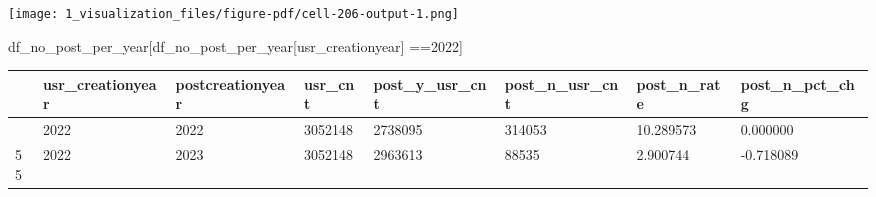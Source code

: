 \documentclass[
  letterpaper,
  DIV=11,
  numbers=noendperiod]{scrartcl}
\newenvironment{Shaded}{\begin{snugshade}}{\end{snugshade}}
\newcommand{\NormalTok}[1]{\textcolor[rgb]{0.00,0.23,0.31}{#1}}
\newcommand{\OperatorTok}[1]{\textcolor[rgb]{0.37,0.37,0.37}{#1}}
\newcommand{\StringTok}[1]{\textcolor[rgb]{0.13,0.47,0.30}{#1}}
\begin{document}
\texttt{[image: 1\_visualization\_files/figure-pdf/cell-206-output-1.png]}

\begin{Shaded}
\begin{Highlighting}[]
\NormalTok{df\_no\_post\_per\_year[df\_no\_post\_per\_year[}\StringTok{\textquotesingle{}usr\_creationyear\textquotesingle{}}\NormalTok{] }\OperatorTok{==}\StringTok{\textquotesingle{}2022\textquotesingle{}}\NormalTok{]}
\end{Highlighting}
\end{Shaded}

\begin{longtable}[]{@{}llllllll@{}}
\toprule\noalign{}
& usr\_creationyear & postcreationyear & usr\_cnt & post\_y\_usr\_cnt &
post\_n\_usr\_cnt & post\_n\_rate & post\_n\_pct\_chg \\
\midrule\noalign{}
\endhead
\bottomrule\noalign{}
\endlastfoot
88 & 2022 & 2022 & 3052148 & 2738095 & 314053 & 10.289573 & 0.000000 \\
55 & 2022 & 2023 & 3052148 & 2963613 & 88535 & 2.900744 & -0.718089 \\
\end{longtable}
\end{document}
